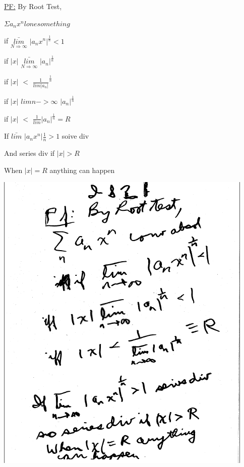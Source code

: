\documentclass[10pt,a4paper]{article}
\begin{document}
{{\begin{center}
\end{center}

{\underline {PF:}} By Root Test,

$\Sigma a_{n} x^{n} lone something$

if ${\underset{\text{$N\Rightarrow \infty$}}{\bar{lim}}}$ $|a_{n} x^{n}|^{\frac{1}{n}}<1$

if $|x|$ ${\underset{\text{$N\Rightarrow \infty$}}{\bar{lim}}}$ $|a_{n}|^{\frac{1}{n}}$

if $|x|$ $<$ ${\frac{1}{lim|a_{n}|}^{\frac{1}{n}}}$

if $|x|$ $lim n->\infty$ ${|a_{n}}|^{\frac{1}{n}}$

if $|x|$ $<$ ${\frac{1}{lim}}{|a_{n}}|^{\frac{1}{n}} = R$

If ${\bar{lim}}$ ${|a_{n}x^{n}}|{\frac{1}{n}} > 1$ soive div

And series div if $|x| > R$ 

When $|x| = R$ anything can happen
\begin{center}

\includegraphics[scale=.7]{Pages/IS_21}

\end{center}
\newpage %

}}
\end{document}
